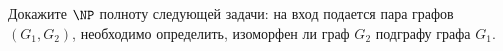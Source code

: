 Докажите $\NP$ полноту следующей задачи: на вход подается пара графов $(G_1, G_2)$, необходимо
определить, изоморфен ли граф $G_2$ подграфу графа $G_1$.
